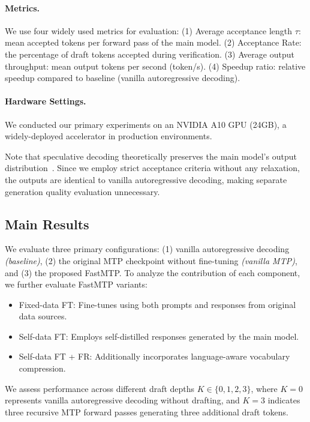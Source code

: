\documentclass{article} %
\begin{document}
\paragraph{Metrics.} We use four widely used metrics for evaluation: (1) Average acceptance length $\tau$: mean accepted tokens per forward pass of the main model. (2) Acceptance Rate: the percentage of draft tokens accepted during verification. (3) Average output throughput: mean output tokens per second (token/s). (4) Speedup ratio: relative speedup compared to baseline (vanilla autoregressive decoding).

\paragraph{Hardware Settings.} 
We conducted our primary experiments on an NVIDIA A10 GPU (24GB), a widely-deployed accelerator in production environments. 


Note that speculative decoding theoretically preserves the main model's output distribution~\citep{leviathan2023fast,chen2023accelerating}. Since we employ strict acceptance criteria without any relaxation, the outputs are identical to vanilla autoregressive decoding, making separate generation quality evaluation unnecessary.

\subsection{Main Results}

We evaluate three primary configurations: (1) vanilla autoregressive decoding \textit{(baseline)}, (2) the original MTP checkpoint without fine-tuning \textit{(vanilla MTP)}, and (3) the proposed FastMTP. To analyze the contribution of each component, we further evaluate FastMTP variants: 
\begin{itemize}
    \item Fixed-data FT: Fine-tunes using both prompts and responses from original data sources.

    \item Self-data FT: Employs self-distilled responses generated by the main model.

    \item Self-data FT + FR: Additionally incorporates language-aware vocabulary compression.
\end{itemize}
We assess performance across different draft depths $K \in \{0, 1, 2, 3\}$, where $K=0$ represents vanilla autoregressive decoding without drafting, and $K=3$ indicates three recursive MTP forward passes generating three additional draft tokens.
\end{document}

